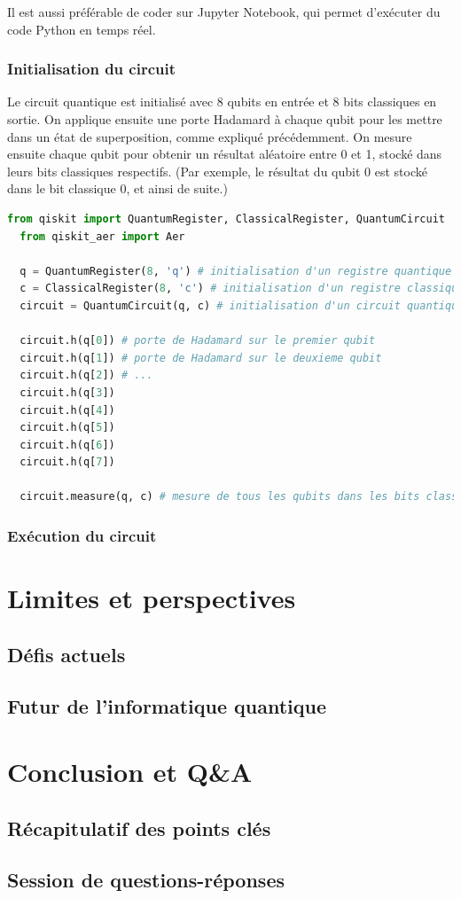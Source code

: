 \documentclass{article}
\begin{document}
Il est aussi préférable de coder sur Jupyter Notebook, qui permet d'exécuter du code Python en temps réel.

\subsubsection{Initialisation du circuit}

Le circuit quantique est initialisé avec 8 qubits en entrée et 8 bits classiques en sortie. On applique ensuite une porte Hadamard à chaque qubit pour les mettre dans un état de superposition, comme expliqué précédemment.
On mesure ensuite chaque qubit pour obtenir un résultat aléatoire entre 0 et 1, stocké dans leurs bits classiques respectifs. (Par exemple, le résultat du qubit 0 est stocké dans le bit classique 0, et ainsi de suite.)

\begin{lstlisting}[language=Python, style=mystyle]
  from qiskit import QuantumRegister, ClassicalRegister, QuantumCircuit
  from qiskit_aer import Aer
  
  q = QuantumRegister(8, 'q') # initialisation d'un registre quantique de 8 qubits
  c = ClassicalRegister(8, 'c') # initialisation d'un registre classique de 8 bits
  circuit = QuantumCircuit(q, c) # initialisation d'un circuit quantique avec les registres q et c
  
  circuit.h(q[0]) # porte de Hadamard sur le premier qubit
  circuit.h(q[1]) # porte de Hadamard sur le deuxieme qubit
  circuit.h(q[2]) # ...
  circuit.h(q[3])
  circuit.h(q[4])
  circuit.h(q[5])
  circuit.h(q[6])
  circuit.h(q[7])
  
  circuit.measure(q, c) # mesure de tous les qubits dans les bits classiques correspondants
\end{lstlisting}

\subsubsection{Exécution du circuit}









\section{Limites et perspectives}
\subsection{Défis actuels}
\subsection{Futur de l'informatique quantique}

\section{Conclusion et Q\&A}
\subsection{Récapitulatif des points clés}
\subsection{Session de questions-réponses}

\break\printbibliography
\end{document}
